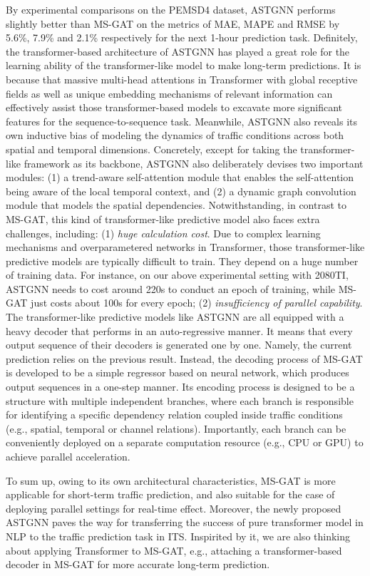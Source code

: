 By experimental comparisons on the PEMSD4 dataset, ASTGNN performs slightly better than MS-GAT on the metrics of MAE, MAPE and RMSE by 5.6\%, 7.9\% and 2.1\% respectively for the next 1-hour prediction task. Definitely, the transformer-based architecture of ASTGNN has played a great role for the learning ability of the transformer-like model to make long-term predictions. It is because that massive multi-head attentions in Transformer with global receptive fields as well as unique embedding mechanisms of relevant information can effectively assist those transformer-based models to excavate more significant features for the sequence-to-sequence task. Meanwhile, ASTGNN also reveals its own inductive bias of modeling the dynamics of traffic conditions across both spatial and temporal dimensions. Concretely, except for taking the transformer-like framework as its backbone, ASTGNN also deliberately devises two important modules: (1) a trend-aware self-attention module that enables the self-attention being aware of the local temporal context, and (2) a dynamic graph convolution module that models the spatial dependencies. Notwithstanding, in contrast to MS-GAT, this kind of transformer-like predictive model also faces extra challenges, including: (1) \textit{huge calculation cost}. Due to complex learning mechanisms and overparametered networks in Transformer, those transformer-like predictive models are typically difficult to train. They depend on a huge number of training data. For instance, on our above experimental setting with 2080TI, ASTGNN needs to cost around 220s to conduct an epoch of training, while MS-GAT just costs about 100s for every epoch; (2) \textit{insufficiency of parallel capability}. The transformer-like predictive models like ASTGNN are all equipped with a heavy decoder that performs in an auto-regressive manner. It means that every output sequence of their decoders is generated one by one. Namely, the current prediction relies on the previous result. Instead, the decoding process of MS-GAT is developed to be a simple regressor based on neural network, which produces output sequences in a one-step manner. Its encoding process is designed to be a structure with multiple independent branches, where each branch is responsible for identifying a specific dependency relation coupled inside traffic conditions (e.g., spatial, temporal or channel relations). Importantly, each branch can be conveniently deployed on a separate computation resource (e.g., CPU or GPU) to achieve parallel acceleration. 

To sum up, owing to its own architectural characteristics, MS-GAT is more applicable for short-term traffic prediction, and also suitable for the case of deploying parallel settings for real-time effect. Moreover, the newly proposed ASTGNN paves the way for transferring the success of pure transformer model in NLP to the traffic prediction task in ITS. Inspirited by it, we are also thinking about applying Transformer to MS-GAT, e.g., attaching a transformer-based decoder in MS-GAT for more accurate long-term prediction. 
